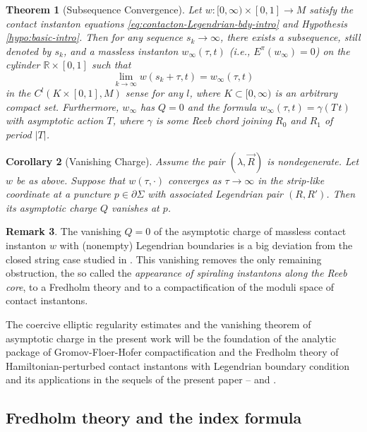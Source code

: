\documentclass[reqno]{amsart}
\def\R{\ifmmode{\mathbb R}\else{$\mathbb R$}\fi} %
\newcommand{\del}{\partial}
\theoremstyle{theorem}
\newtheorem{thm}{Theorem}[section]
\newtheorem{cor}[thm]{Corollary}
\theoremstyle{definition}
\newtheorem{rem}[thm]{Remark}
\numberwithin{equation}{section}
\def\R{{\mathbb R}}
\def\R{{\mathbb R}}
\def\R{\ifmmode{\mathbb R}\else{$\mathbb R$}\fi} %
\def\R{{\mathbb R}}
\def\R{{\mathbb R}}
\begin{document}
\begin{thm}[Subsequence Convergence]\label{thm:subsequence-intro}
Let $w:[0, \infty)\times [0,1]\to M$ satisfy the contact instanton equations \eqref{eq:contacton-Legendrian-bdy-intro}
and Hypothesis \ref{hypo:basic-intro}.
Then for any sequence $s_k\to \infty$, there exists a subsequence, still denoted by $s_k$, and a
massless instanton $w_\infty(\tau,t)$ (i.e., $E^\pi(w_\infty) = 0$)
on the cylinder $\R \times [0,1]$  such that
$$
\lim_{k\to \infty}w(s_k + \tau, t) = w_\infty(\tau,t)
$$
in the $C^l(K \times [0,1], M)$ sense for any $l$, where $K\subset [0,\infty)$ is an arbitrary compact set.
Furthermore, $w_\infty$ has $Q = 0$ and the formula $w_\infty(\tau,t)= \gamma(T\, t)$  with
asymptotic action $T$, where $\gamma$ is some Reeb chord joining $R_0$ and $R_1$ of period $|T|$.
\end{thm}
\begin{cor}[Vanishing Charge] Assume the pair $(\lambda, \vec R)$ is nondegenerate.
Let $w$ be as above. Suppose that $w(\tau,\cdot)$ converges as $\tau \to \infty$ in the
strip-like coordinate at a puncture $p \in \del \Sigma$  with associated Legendrian pair $(R,R')$.
 Then its  asymptotic charge $Q$ vanishes at $p$.
 \end{cor}

\begin{rem}\label{rem:big-difference-intro}
The vanishing $Q = 0$ of the asymptotic charge of massless
contact instanton $w$ with (nonempty) Legendrian boundaries is a big deviation from
the closed string case studied in \cite{oh-wang:CR-map1,oh-wang:CR-map2,oh:contacton}.
This vanishing removes the only remaining obstruction, the so called the \emph{appearance of spiraling instantons along the
Reeb core}, to a Fredholm theory and to a compactification of the moduli space of contact instantons.
\end{rem}

The coercive elliptic regularity estimates and the vanishing theorem of asymptotic charge in the present
work will be the foundation of the analytic package of Gromov-Floer-Hofer compactification and
the Fredholm theory of Hamiltonian-perturbed contact instantons with Legendrian boundary condition and its applications in the sequels of the present paper \cite{oh:contacton-transversality}--\cite{oh:contacton-gluing} and \cite{oh-yso:spectral}.

\subsection{Fredholm theory and the index formula}
\label{subsec:index-formula}
\end{document}

